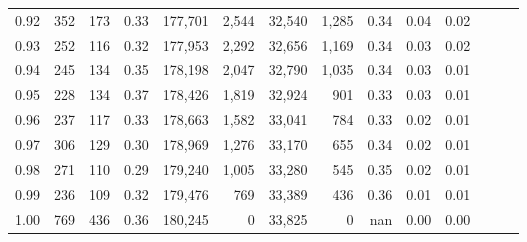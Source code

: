 \begin{tabular}{rrrrrrrrrrrrrr}
0.92 &    352 &  173 &  0.33 &  177,701 &    2,544 &  32,540 &   1,285 &  0.34 &  0.04 &      0.02 \\
0.93 &    252 &  116 &  0.32 &  177,953 &    2,292 &  32,656 &   1,169 &  0.34 &  0.03 &      0.02 \\
0.94 &    245 &  134 &  0.35 &  178,198 &    2,047 &  32,790 &   1,035 &  0.34 &  0.03 &      0.01 \\
0.95 &    228 &  134 &  0.37 &  178,426 &    1,819 &  32,924 &     901 &  0.33 &  0.03 &      0.01 \\
0.96 &    237 &  117 &  0.33 &  178,663 &    1,582 &  33,041 &     784 &  0.33 &  0.02 &      0.01 \\
0.97 &    306 &  129 &  0.30 &  178,969 &    1,276 &  33,170 &     655 &  0.34 &  0.02 &      0.01 \\
0.98 &    271 &  110 &  0.29 &  179,240 &    1,005 &  33,280 &     545 &  0.35 &  0.02 &      0.01 \\
0.99 &    236 &  109 &  0.32 &  179,476 &      769 &  33,389 &     436 &  0.36 &  0.01 &      0.01 \\
1.00 &    769 &  436 &  0.36 &  180,245 &        0 &  33,825 &       0 &   nan &  0.00 &      0.00 \\
\bottomrule
\end{tabular}
